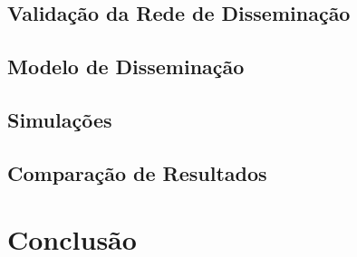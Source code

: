 \documentclass[a4paper,12pt]{article}
\begin{document}
\subsection{Validação da Rede de Disseminação}

\subsection{Modelo de Disseminação}

\subsection{Simulações}

\subsection{Comparação de Resultados}

\section{Conclusão}
\end{document}
